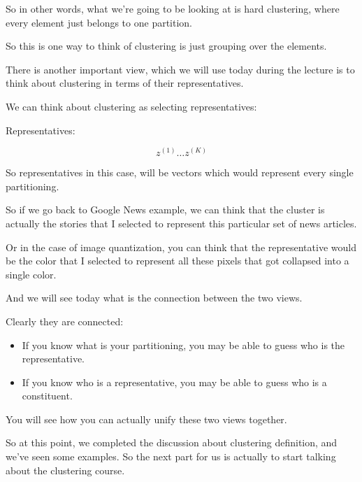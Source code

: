 \documentclass[a4paper, 12pt]{article}
\begin{document}
So in other words, what we're going to be looking at is hard clustering, where
every element just belongs to one partition.

So this is one way to think of clustering is just grouping over the elements.

There is another important view, which we will use today during the lecture is
to think about clustering in terms of their representatives.

We can think about clustering as selecting representatives:

Representatives:

\begin{equation}
z^{(1)} \ldots z^{(K)}
\end{equation}

So representatives in this case, will be vectors which would represent every
single partitioning.

So if we go back to Google News example, we can think that the cluster is
actually the stories that I selected to represent this particular set of news
articles.

Or in the case of image quantization, you can think that the representative
would be the color that I selected to represent all these pixels that got
collapsed into a single color.

And we will see today what is the connection between the two views.

Clearly they are connected:
\begin{itemize}
\item If you know what is your partitioning, you may be able to guess who is the
representative.
\item If you know who is a representative, you may be able to guess who is a
constituent.
\end{itemize}

You will see how you can actually unify these two views together.

So at this point, we completed the discussion about clustering definition, and
we've seen some examples. So the next part for us is actually to start talking
about the clustering course.
\end{document}
